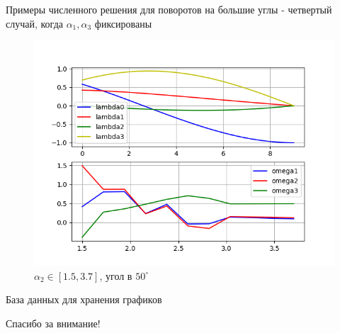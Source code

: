 \documentclass[10pt,utf8,presentation,notheorems,xcolor=dvipsnames,compress]{beamer}
\begin{document}
\begin{frame}{Примеры численного решения для поворотов на большие углы - четвертый случай, когда $\alpha_1, \alpha_3$ фиксированы}
\begin{figure}[H]
\center\includegraphics[scale=0.5]{fig/ivp_and_control_alpha2_1_5-3_7_50.png}
\caption{$\alpha_2 \in [1.5, 3.7]$, угол в $50^{\circ}$}
\end{figure}
\end{frame}

\begin{frame}{База данных для хранения графиков}
\end{frame}

\begin{frame}[standout]
Спасибо за внимание!
\end{frame}
\end{document}
